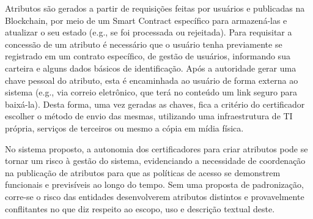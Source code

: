 \documentclass[a4paper,11pt]{article}
\begin{document}
Atributos são gerados a partir de requisições feitas por usuários e publicadas na Blockchain, por meio de um Smart Contract específico para armazená-las e atualizar o seu estado (e.g., se foi processada ou rejeitada).
Para requisitar a concessão de um atributo é necessário que o usuário tenha previamente se registrado em um contrato específico, de gestão de usuários, informando sua carteira e alguns dados básicos de identificação.
Após a autoridade gerar uma chave pessoal do atributo, esta é encaminhada ao usuário de forma externa ao sistema (e.g., via correio eletrônico, que terá no conteúdo um link seguro para baixá-la). %
Desta forma, uma vez geradas as chaves, fica a critério do certificador escolher o método de envio das mesmas, utilizando uma infraestrutura de TI própria, serviços de terceiros ou mesmo a cópia em mídia física.


No sistema proposto, a autonomia dos certificadores para criar atributos pode se tornar um risco à gestão do sistema, evidenciando a necessidade de coordenação na publicação de atributos para que as políticas de acesso se demonstrem funcionais e previsíveis ao longo do tempo. %
Sem uma proposta de padronização, corre-se o risco das entidades desenvolverem atributos distintos e provavelmente conflitantes no que diz respeito ao escopo, uso e descrição textual deste.
\end{document}
